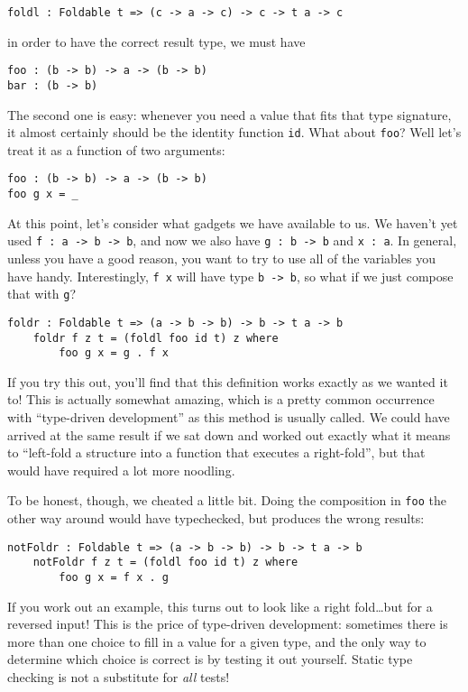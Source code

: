 \documentclass{book}
\newcommand{\mlil}[1]{\lstinline[language=pseudoml,columns=fixed]|#1|}\usepackage{caption}
\begin{document}
\begin{lstlisting}[language=pseudoml]
foldl : Foldable t => (c -> a -> c) -> c -> t a -> c
\end{lstlisting}

\noindent in order to have the correct result type, we must have

\begin{lstlisting}[language=pseudoml]
foo : (b -> b) -> a -> (b -> b)
bar : (b -> b)
\end{lstlisting}

The second one is easy: whenever you need a value that fits that type signature, it almost certainly should be the identity function \mlil{id}. What about \texttt{foo}? Well let's treat it as a function of two arguments:

\begin{lstlisting}[language=pseudoml]
foo : (b -> b) -> a -> (b -> b)
foo g x = _
\end{lstlisting}

At this point, let's consider what gadgets we have available to us. We haven't yet used \mlil{f : a -> b -> b}, and now we also have \mlil{g : b -> b} and \mlil{x : a}. In general, unless you have a good reason, you want to try to use all of the variables you have handy. Interestingly, \mlil{f x} will have type \mlil{b -> b}, so what if we just compose that with \mlil{g}?

\begin{lstlisting}[language=pseudoml]
    foldr : Foldable t => (a -> b -> b) -> b -> t a -> b
    foldr f z t = (foldl foo id t) z where
        foo g x = g . f x
\end{lstlisting}

If you try this out, you'll find that this definition works exactly as we wanted it to! This is actually somewhat amazing, which is a pretty common occurrence with ``type-driven development'' as this method is usually called. We could have arrived at the same result if we sat down and worked out exactly what it means to ``left-fold a structure into a function that executes a right-fold'', but that would have required a lot more noodling.

To be honest, though, we cheated a little bit. Doing the composition in \texttt{foo} the other way around would have typechecked, but produces the wrong results:

\begin{lstlisting}[language=pseudoml]
    notFoldr : Foldable t => (a -> b -> b) -> b -> t a -> b
    notFoldr f z t = (foldl foo id t) z where
        foo g x = f x . g
\end{lstlisting}

If you work out an example, this turns out to look like a right fold\ldots{}but for a reversed input! This is the price of type-driven development: sometimes there is more than one choice to fill in a value for a given type, and the only way to determine which choice is correct is by testing it out yourself. Static type checking is not a substitute for \emph{all} tests!
\end{document}
